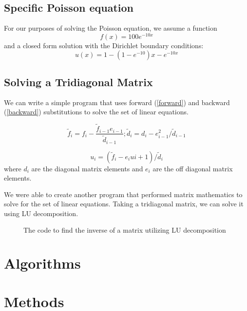 \documentclass[10pt,showpacs,preprintnumbers,footinbib,amsmath,amssymb,aps,prl,twocolumn,groupedaddress,superscriptaddress,showkeys]{revtex4-1}
\begin{document}
	\subsection{Specific Poisson equation}	
For our purposes of solving the Poisson equation, we assume a function \begin{equation}
	f(x)=100e^{-10x}
	\end{equation}
and a closed form solution with the Dirichlet boundary conditions:
	\begin{equation}
	u(x)=1-(1-e^{-10})x-e^{-10x}
	\end{equation}

	\subsection{Solving a Tridiagonal Matrix}	
We can write a simple program that uses forward (\ref{forward}) and backward (\ref{backward}) substitutions to solve the set of linear equations.
	
	\begin{equation}
	\tilde{f}_{i}=f_{i}-\frac{\tilde{f}_{i-1}e_{i-1}}{\tilde{d}_{i-1}} ; \tilde{d}_{i}=d_{i}-e^{2}_{i-1}/\tilde{d}_{i-1}
	\label{forward}
	\end{equation}
	
	\begin{equation}
	u_{i} = (\tilde{f}_{i}-e_{i}u{i+1})/\tilde{d}_{i}
	\label{backward}
	\end{equation}
where $d_{i}$ are the diagonal matrix elements and $e_{i}$ are the off diagonal matrix elements.
	


We were able to create another program that performed matrix mathematics to solve for the set of linear equations.  Taking a tridiagonal matrix, we can solve it using LU decomposition.
	
	
	\begin{figure}[!ht]
			\centering
			
			\label{ludecomp}
			\caption{The code to find the inverse of a matrix utilizing LU decomposition}
		\end{figure}

\section{Algorithms}	

\section{Methods}
\end{document}
